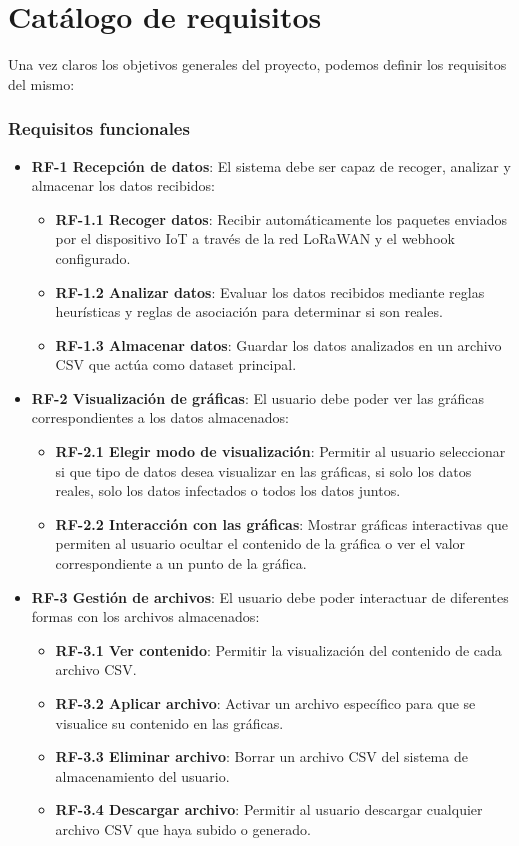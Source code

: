 \section{Catálogo de requisitos}
Una vez claros los objetivos generales del proyecto, podemos definir los requisitos del mismo:
\subsubsection{Requisitos funcionales}

\begin{itemize}
    \item \textbf{RF-1 Recepción de datos}: El sistema debe ser capaz de recoger, analizar y almacenar los datos recibidos:
    \begin{itemize}
        \item \textbf{RF-1.1 Recoger datos}: Recibir automáticamente los paquetes enviados por el dispositivo IoT a través de la red LoRaWAN y el webhook configurado.
        \item \textbf{RF-1.2 Analizar datos}: Evaluar los datos recibidos mediante reglas heurísticas y reglas de asociación para determinar si son reales.
        \item \textbf{RF-1.3 Almacenar datos}: Guardar los datos analizados en un archivo CSV que actúa como dataset principal.
    \end{itemize}

    \item \textbf{RF-2 Visualización de gráficas}: El usuario debe poder ver las gráficas correspondientes a los datos almacenados:
    \begin{itemize}
        \item \textbf{RF-2.1 Elegir modo de visualización}: Permitir al usuario seleccionar si que tipo de datos desea visualizar en las gráficas, si solo los datos reales, solo los datos infectados o todos los datos juntos.
        \item \textbf{RF-2.2 Interacción con las gráficas}: Mostrar gráficas interactivas que permiten al usuario ocultar el contenido de la gráfica o ver el valor correspondiente a un punto de la gráfica.
    \end{itemize}

    \item \textbf{RF-3 Gestión de archivos}: El usuario debe poder interactuar de diferentes formas con los archivos almacenados:
    \begin{itemize}
        \item \textbf{RF-3.1 Ver contenido}: Permitir la visualización del contenido de cada archivo CSV.
        \item \textbf{RF-3.2 Aplicar archivo}: Activar un archivo específico para que se visualice su contenido en las gráficas.
        \item \textbf{RF-3.3 Eliminar archivo}: Borrar un archivo CSV del sistema de almacenamiento del usuario.
        \item \textbf{RF-3.4 Descargar archivo}: Permitir al usuario descargar cualquier archivo CSV que haya subido o generado.
    \end{itemize}


\end{itemize}
